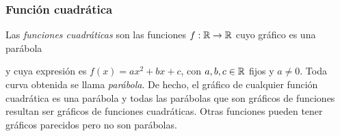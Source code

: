 \documentclass[../teoria.root.tex]{subfiles}
\begin{document}
\subsubsection{Función cuadrática}
Las \textit{funciones cuadráticas} son las funciones \(f: \mathbb{R} \rightarrow \mathbb{R}\) cuyo gráfico es una parábola
\begin{center}
\end{center}
y cuya expresión es \(f(x)=ax^2+bx+c\), con \(a,b,c\in\mathbb{R}\) fijos y \(a\neq0\).
Toda curva obtenida se llama \textit{parábola}.
De hecho, el gráfico de cualquier función cuadrática es una parábola y todas las parábolas que son gráficos de funciones resultan ser gráficos de funciones cuadráticas.
Otras funciones pueden tener gráficos parecidos pero no son parábolas.
\end{document}

